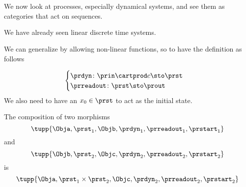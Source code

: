 
\section{}

We now look at processes, especially dynamical systems, and see them as categories that act on sequences.

We have already seen linear discrete time systems.

We can generalize by allowing non-linear functions, so to have
the definition as follows

\begin{equation}
    \begin{cases}
    \prdyn \colon \prin \cartprod c\sto \prst \\
    \prreadout \colon \prst \sto \prout
    \end{cases}
\end{equation}
We also need to have an $x_0 \in \prst$ to act as the initial state. 

The composition of two morphisms
\begin{equation}
  \tupp{\Obja,\prst_1,\Objb,\prdyn_1,\prreadout_1,\prstart_1}
\end{equation}
and
\begin{equation}
\tupp{\Objb,\prst_2,\Objc,\prdyn_2,\prreadout_2,\prstart_2}
\end{equation}
is 
\begin{equation}
  \tupp{\Obja,\prst_1 \times \prst_2,\Objc,\prdyn_2,\prreadout_2,\prstart_2}
\end{equation}
%

